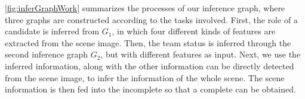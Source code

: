 \autoref{fig:inferGraphWork} summarizes the processes of our inference graph, where three graphs are constructed according to the tasks involved. First, the role of a candidate is inferred from $G_1$, in which four different kinds of features are extracted from the scene image. Then, the team status is inferred through the second inference graph $G_2$, but with different features as input. Next, we use the inferred information, along with the other information can be directly detected from the scene image, to infer the information of the whole scene.
The scene information is then fed into the incomplete  so that a complete  can be obtained. 

